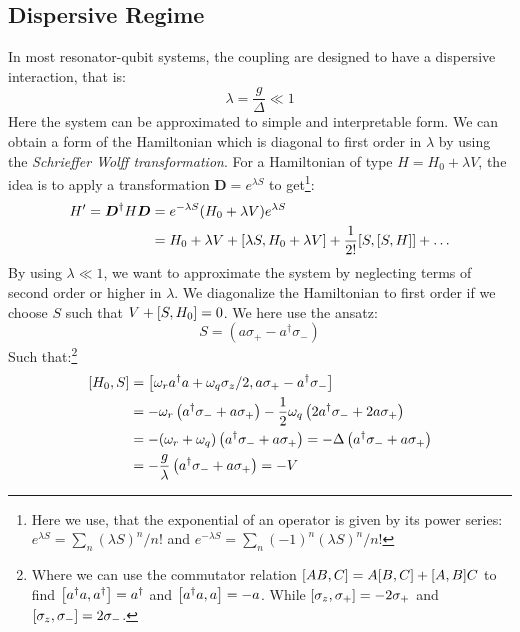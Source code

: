 \subsection{Dispersive Regime}\label{sec:dispersive_regime}
In most resonator-qubit systems, the coupling are designed to have a dispersive interaction, that is:
\begin{equation}
    \lambda = \frac{g}{\Delta} \ll 1
\end{equation}
Here the system can be approximated to simple and interpretable  form. We can obtain a form of the Hamiltonian which is diagonal to first order in $\lambda$ by using the \textit{Schrieffer Wolff transformation}. For a Hamiltonian of type $H = H_0 + \lambda V$, the idea is to apply a transformation $\boldsymbol{D} = e^{\lambda S}$ to get\footnote{Here we use, that the exponential of an operator is given by its power series: $e^{\lambda S} = \sum_n (\lambda S)^n / n!$ and $e^{-\lambda  S} = \sum_n (-1)^n (\lambda S)^n / n!$}:
\begin{align*}
    H' = \boldsymbol{D}^\dagger H \boldsymbol{D} &= e^{-\lambda S} (H_0 + \lambda V) e^{\lambda  S} \\
    &= H_0 + \lambda V + \comm{\lambda S}{H_0 + \lambda V} + \frac{1}{2!} \comm{S}{\comm{S}{H}} + \dots
\end{align*}
By using $\lambda \ll 1$, we want to approximate the system by neglecting terms of second order or higher in $\lambda$. We diagonalize the Hamiltonian to first order if we choose $S$ such that $V + \comm{S}{H_0} = 0$. We here use the ansatz:
\begin{equation}
    S = (a \sigma_+ - a^\dagger \sigma_-)
\end{equation}
Such that:\footnote{Where we can use the commutator relation $\comm{AB}{C} = A\comm{B}{C} + \comm{A}{B}C$ to find $\comm{a^\dagger a}{a^\dagger} = a^\dagger$ and $\comm{a^\dagger a}{a} = - a$. While $\comm{\sigma_z}{\sigma_+} = -2\sigma_+$ and $\comm{\sigma_z}{\sigma_-} = 2\sigma_-$.}
\begin{align*}
    \comm{H_0}{S} &= \comm{\omega_r a^\dagger a + \omega_q \sigma_z / 2}{a \sigma_+ - a^\dagger \sigma_-} \\
    &= - \omega_r \left(a^\dagger \sigma_- + a \sigma_+\right) - \frac12 \omega_q \left(2a^\dagger \sigma_- + 2 a \sigma_+ \right) \\
    &= -  (\omega_r + \omega_q)\left(a^\dagger \sigma_- + a \sigma_+\right) = - \Delta \left(a^\dagger \sigma_- + a \sigma_+\right) \\
    &= - \frac{g}{\lambda} \left(a^\dagger \sigma_- + a \sigma_+\right) = - V 
\end{align*}
